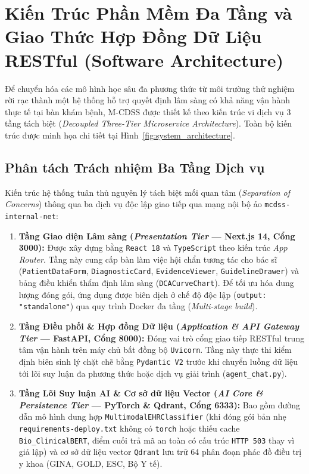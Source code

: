 \section{Kiến Trúc Phần Mềm Đa Tầng và Giao Thức Hợp Đồng Dữ Liệu RESTful (Software Architecture)}
\label{sec:software_architecture}

Để chuyển hóa các mô hình học sâu đa phương thức từ môi trường thử nghiệm rời rạc thành một hệ thống hỗ trợ quyết định lâm sàng có khả năng vận hành thực tế tại bàn khám bệnh, M-CDSS được thiết kế theo kiến trúc vi dịch vụ 3 tầng tách biệt (\textit{Decoupled Three-Tier Microservice Architecture}). Toàn bộ kiến trúc được minh họa chi tiết tại Hình~\ref{fig:system_architecture}.



\subsection{Phân tách Trách nhiệm Ba Tầng Dịch vụ}
Kiến trúc hệ thống tuân thủ nguyên lý tách biệt mối quan tâm (\textit{Separation of Concerns}) thông qua ba dịch vụ độc lập giao tiếp qua mạng nội bộ ảo \texttt{mcdss-internal-net}:
\begin{enumerate}[leftmargin=1.8em, itemsep=0.25em]
    \item \textbf{Tầng Giao diện Lâm sàng (\textit{Presentation Tier} --- Next.js 14, Cổng 3000):} Được xây dựng bằng \texttt{React 18} và \texttt{TypeScript} theo kiến trúc \textit{App Router}. Tầng này cung cấp bàn làm việc hội chẩn tương tác cho bác sĩ (\texttt{PatientDataForm}, \texttt{DiagnosticCard}, \texttt{EvidenceViewer}, \texttt{GuidelineDrawer}) và bảng điều khiển thẩm định lâm sàng (\texttt{DCACurveChart}). Để tối ưu hóa dung lượng đóng gói, ứng dụng được biên dịch ở chế độ độc lập (\texttt{output: "standalone"}) qua quy trình Docker đa tầng (\textit{Multi-stage build}).
    \item \textbf{Tầng Điều phối \& Hợp đồng Dữ liệu (\textit{Application \& API Gateway Tier} --- FastAPI, Cổng 8000):} Đóng vai trò cổng giao tiếp RESTful trung tâm vận hành trên máy chủ bất đồng bộ \texttt{Uvicorn}. Tầng này thực thi kiểm định biên sinh lý chặt chẽ bằng \texttt{Pydantic V2} trước khi chuyển luồng dữ liệu tới lõi suy luận đa phương thức hoặc dịch vụ giải trình (\texttt{agent\_chat.py}).
    \item \textbf{Tầng Lõi Suy luận AI \& Cơ sở dữ liệu Vector (\textit{AI Core \& Persistence Tier} --- PyTorch \& Qdrant, Cổng 6333):} Bao gồm đường dẫn mô hình dung hợp \texttt{MultimodalEHRClassifier} (khi đóng gói bản nhẹ \texttt{requirements-deploy.txt} không có \texttt{torch} hoặc thiếu cache \texttt{Bio\_ClinicalBERT}, điểm cuối trả mã an toàn có cấu trúc \texttt{HTTP 503} thay vì giả lập) và cơ sở dữ liệu vector \texttt{Qdrant} lưu trữ 64 phân đoạn phác đồ điều trị y khoa (GINA, GOLD, ESC, Bộ Y tế).
\end{enumerate}

